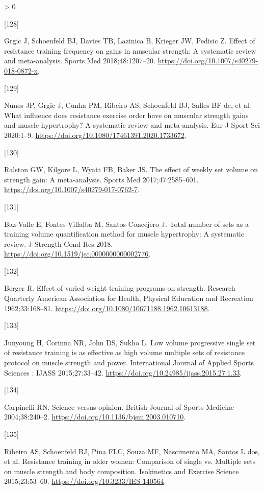 \documentclass[twoside,10pt]{gihclass} %
\newlength{\cslhangindent}
\newlength{\csllabelwidth}
\newenvironment{CSLReferences}[3] %
 {%
  \setlength{\parindent}{0pt}
  \ifodd #1 \everypar{\setlength{\hangindent}{\cslhangindent}}\ignorespaces\fi
  \ifnum #2 > 0
  \setlength{\parskip}{#2\baselineskip}
  \fi
 }%
 {}
\newcommand{\CSLLeftMargin}[1]{\parbox[t]{\maxof{\widthof{#1}}{\csllabelwidth}}{#1}}
\newcommand{\CSLRightInline}[1]{\parbox[t]{\linewidth}{#1}}
\begin{document}
\begin{CSLReferences}{0}{0}
\leavevmode\hypertarget{ref-RN2570}{}%
\CSLLeftMargin{{[}128{]} }
\CSLRightInline{Grgic J, Schoenfeld BJ, Davies TB, Lazinica B, Krieger JW, Pedisic Z. Effect of resistance training frequency on gains in muscular strength: A systematic review and meta-analysis. Sports Med 2018;48:1207--20. \url{https://doi.org/10.1007/s40279-018-0872-x}.}

\leavevmode\hypertarget{ref-RN2591}{}%
\CSLLeftMargin{{[}129{]} }
\CSLRightInline{Nunes JP, Grgic J, Cunha PM, Ribeiro AS, Schoenfeld BJ, Salles BF de, et al. What influence does resistance exercise order have on muscular strength gains and muscle hypertrophy? A systematic review and meta-analysis. Eur J Sport Sci 2020:1--9. \url{https://doi.org/10.1080/17461391.2020.1733672}.}

\leavevmode\hypertarget{ref-RN2492}{}%
\CSLLeftMargin{{[}130{]} }
\CSLRightInline{Ralston GW, Kilgore L, Wyatt FB, Baker JS. The effect of weekly set volume on strength gain: A meta-analysis. Sports Med 2017;47:2585--601. \url{https://doi.org/10.1007/s40279-017-0762-7}.}

\leavevmode\hypertarget{ref-RN2130}{}%
\CSLLeftMargin{{[}131{]} }
\CSLRightInline{Baz-Valle E, Fontes-Villalba M, Santos-Concejero J. Total number of sets as a training volume quantification method for muscle hypertrophy: A systematic review. J Strength Cond Res 2018. \url{https://doi.org/10.1519/jsc.0000000000002776}.}

\leavevmode\hypertarget{ref-RN1476}{}%
\CSLLeftMargin{{[}132{]} }
\CSLRightInline{Berger R. Effect of varied weight training programs on strength. Research Quarterly American Association for Health, Physical Education and Recreation 1962;33:168--81. \url{https://doi.org/10.1080/10671188.1962.10613188}.}

\leavevmode\hypertarget{ref-RN2568}{}%
\CSLLeftMargin{{[}133{]} }
\CSLRightInline{Junyoung H, Corinna NR, John DS, Sukho L. Low volume progressive single set of resistance training is as effective as high volume multiple sets of resistance protocol on muscle strength and power. International Journal of Applied Sports Sciences : IJASS 2015;27:33--42. \url{https://doi.org/10.24985/ijass.2015.27.1.33}.}

\leavevmode\hypertarget{ref-RN2201}{}%
\CSLLeftMargin{{[}134{]} }
\CSLRightInline{Carpinelli RN. Science versus opinion. British Journal of Sports Medicine 2004;38:240--2. \url{https://doi.org/10.1136/bjsm.2003.010710}.}

\leavevmode\hypertarget{ref-RN2465}{}%
\CSLLeftMargin{{[}135{]} }
\CSLRightInline{Ribeiro AS, Schoenfeld BJ, Pina FLC, Souza MF, Nascimento MA, Santos L dos, et al. Resistance training in older women: Comparison of single vs. Multiple sets on muscle strength and body composition. Isokinetics and Exercise Science 2015;23:53--60. \url{https://doi.org/10.3233/IES-140564}.}


\end{CSLReferences}
\end{document}
